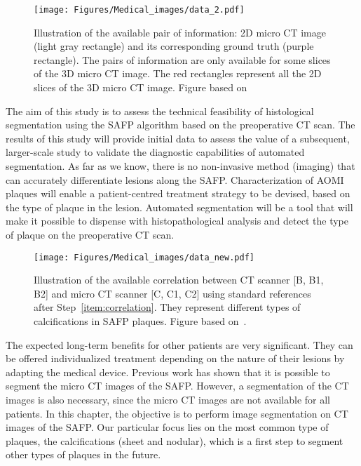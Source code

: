 \begin{figure}[H]
    \centering
    \texttt{[image: Figures/Medical\_images/data\_2.pdf]}
    \caption{Illustration of the available pair of information: 2D micro CT image 
    (light gray rectangle) and its corresponding ground truth (purple rectangle).
    The pairs of information are only available for some slices of the 3D micro CT image.
    The red rectangles represent all the 2D slices of the 3D micro CT image.
    Figure based on~\citep{kuntz2021co}}
    \label{fig:data_availability_2}
\end{figure}



The aim of this study is to assess the technical
feasibility of histological segmentation using the SAFP algorithm based on the
preoperative CT scan. The results of this study will provide initial data to
assess the value of a subsequent, larger-scale study to validate the diagnostic
capabilities of automated segmentation.
As far as we know,  there is no non-invasive method (imaging) that can accurately
differentiate lesions along the SAFP. Characterization of  AOMI 
plaques will enable a patient-centred treatment strategy to be devised, based on the 
type of plaque in the lesion. 
Automated segmentation will be a tool that will make it possible to dispense
with histopathological analysis and detect the type of plaque on the
preoperative CT scan. 
\begin{figure}[htb!]
    \centering
    \texttt{[image: Figures/Medical\_images/data\_new.pdf]}
    \caption{Illustration of the available correlation between CT scanner [B, B1, B2] and
    micro CT scanner [C, C1, C2] using standard references after Step~\ref{item:correlation}. 
    They represent different types of calcifications in SAFP plaques.
    Figure based on~\citep{kuntz2021co}.}
    \label{fig:data_availability}
\end{figure}
The expected long-term benefits for other patients are very significant. They
can be offered individualized treatment depending on the nature of their lesions
by adapting the medical device.
Previous work has shown that it is possible to segment the micro CT images of the
SAFP. However, a segmentation of the CT images is also necessary, since the
micro CT images are not available for all patients.
In this chapter, the objective is to perform image segmentation on CT
images of the SAFP. Our particular focus
lies on the most common type of plaques, the calcifications (sheet and nodular), 
which is a first step to segment other types of plaques in the future.

